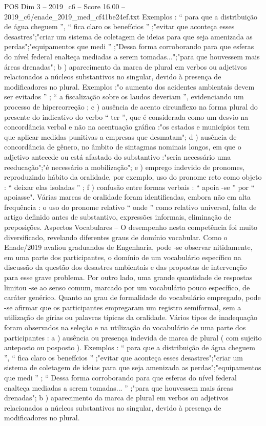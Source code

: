 \begin{textsample}{POS Dim 3 – 2019\_c6 – Score 16.00 – 2019\_c6/enade\_2019\_med\_cf41be24ef.txt}
Exemplos : “ para que a distribuição de água cheguem ”, “ fica claro os benefícios ” ;"evitar que aconteça esses desastres";"criar um sistema de coletagem de ideias para que seja amenizada as perdas";"equipamentos que medi ” ;"Dessa forma corroborando para que esferas do nível federal enalteça mediadas a serem tomadas...";"para que houvessem mais áreas drenadas"; b ) aparecimento da marca de plural em verbos ou adjetivos relacionados a núcleos substantivos no singular, devido à presença de modificadores no plural.
Exemplos :"o aumento dos acidentes ambientais devem ser evitados ” ; “ a fiscalização sobre os laudos deveriam ”, evidenciando um processo de hipercorreção ; c ) ausência de acento circunflexo na forma plural do presente do indicativo do verbo “ ter ”, que é considerada como um desvio na concordância verbal e não na acentuação gráfica :"os estados e municípios tem que aplicar medidas punitivas a empresas que desmatam"; d ) ausência de concordância de gênero, no âmbito de sintagmas nominais longos, em que o adjetivo antecede ou está afastado do substantivo :"seria necessário uma reeducação";"é necessário a mobilização"; e ) emprego indevido de pronomes, reproduzindo hábito da oralidade, por exemplo, uso do pronome reto como objeto : “ deixar elas isoladas ” ; f ) confusão entre formas verbais : “ apoia -se ” por “ apoiasse".
Várias marcas de oralidade foram identificadas, embora não em alta frequência : o uso do pronome relativo “ onde ” como relativo universal, falta de artigo definido antes de substantivo, expressões informais, eliminação de preposições.
Aspectos Vocabulares – O desempenho nesta competência foi muito diversificado, revelando diferentes graus de domínio vocabular.
Como o Enade/2019 avaliou graduandos de Engenharia, pode -se observar nitidamente, em uma parte dos participantes, o domínio de um vocabulário específico na discussão da questão dos desastres ambientais e das propostas de intervenção para esse grave problema.
Por outro lado, uma grande quantidade de respostas limitou -se ao senso comum, marcado por um vocabulário pouco específico, de caráter genérico.
Quanto ao grau de formalidade do vocabulário empregado, pode -se afirmar que os participantes empregaram um registro semiformal, sem a utilização de gírias ou palavras típicas da oralidade.
Vários tipos de inadequação foram observados na seleção e na utilização do vocabulário de uma parte dos participantes : a ) ausência ou presença indevida de marca de plural ( com sujeito anteposto ou posposto ).
Exemplos : “ para que a distribuição de água cheguem ”, “ fica claro os benefícios ” ;"evitar que aconteça esses desastres";"criar um sistema de coletagem de ideias para que seja amenizada as perdas";"equipamentos que medi ” ; “ Dessa forma corroborando para que esferas do nível federal enalteça mediadas a serem tomadas... ” ;"para que houvessem mais áreas drenadas"; b ) aparecimento da marca de plural em verbos ou adjetivos relacionados a núcleos substantivos no singular, devido à presença de modificadores no plural.

\end{textsample}
